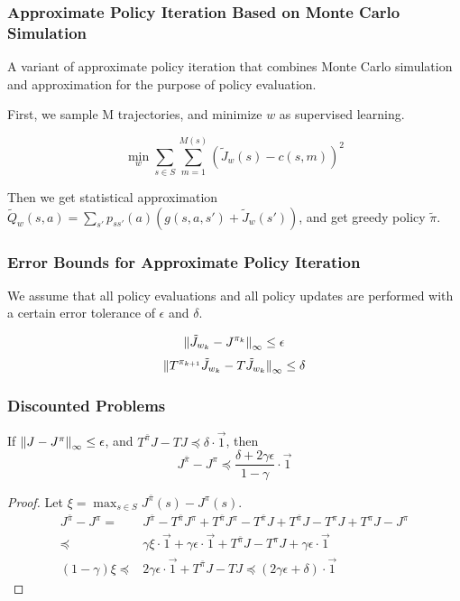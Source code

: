 \subsubsection{Approximate Policy Iteration Based on Monte Carlo Simulation}%

A variant of approximate policy iteration that combines Monte Carlo simulation and approximation for the purpose of policy evaluation.

First, we sample M trajectories, and minimize $ w $ as supervised learning.

\[
    \min_{w} \sum^{}_{s \in S} \sum^{M(s)}_{m = 1} {(\tilde J_w(s) - c(s, m))}^2
\]

Then we get statistical approximation $ \tilde Q_{w}(s, a) = \sum^{}_{s'} p_{ss'}(a) \left( g(s, a, s') + \tilde J_{w}(s') \right) $, and get greedy policy $ \tilde \pi $.

\subsubsection{Error Bounds for Approximate Policy Iteration}%

We assume that all policy evaluations and all policy updates are performed with a certain error tolerance of $ \epsilon $ and $ \delta $.

\[
    {\Arrowvert \tilde J_{w_k} - J^{\pi_k} \Arrowvert}_\infty \le \epsilon
\]
\[
    {\Arrowvert T^{\pi_{k+1}} \tilde J_{w_k} - T \tilde J_{w_k} \Arrowvert}_\infty \le \delta
\]

\subsubsection*{Discounted Problems}%
\begin{lemma}
    If $ {\Arrowvert J - J^{\pi} \Arrowvert}_\infty \le \epsilon $, and $  T^{\bar \pi} J - TJ \preceq \delta \cdot \vec{1}$, then
    \[
         J^{\bar\pi} - J^{\pi} \preceq \frac{\delta + 2\gamma \epsilon}{1 - \gamma} \cdot \vec{1}
    \]
    \begin{proof}
        Let $ \xi = \max_{s \in S} J^{\bar\pi}(s) - J^{\pi}(s) $.
        \begin{align*}
            J^{\bar\pi} - J^{\pi} =& J^{\bar\pi} - T^{\bar\pi} J^{\pi} + T^{\bar\pi}J^{\pi} - T^{\bar\pi}J + T^{\bar\pi}J - T^{\pi}J + T^{\pi}J - J^{\pi}\\
            \preceq& \gamma \xi\cdot \vec{1} + \gamma\epsilon \cdot \vec{1} + T^{\bar\pi}J - T^{\pi}J + \gamma\epsilon \cdot \vec{1}\\
            (1 - \gamma) \xi \preceq& 2\gamma\epsilon\cdot \vec{1} + T^{\bar\pi}J - TJ
            \preceq (2\gamma\epsilon + \delta)\cdot \vec{1}
        \end{align*}
    \end{proof}
\end{lemma}

